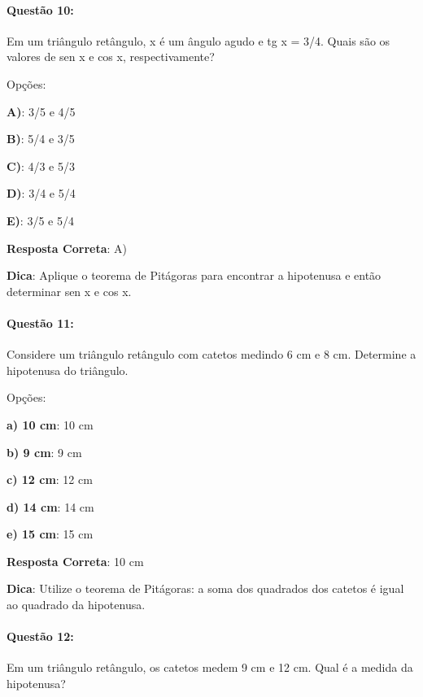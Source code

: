 \documentclass{article}
\begin{document}
\paragraph{Questão 10:}
{Em um triângulo retângulo, x é um ângulo agudo e tg x = 3/4. Quais são os valores de sen x e cos x, respectivamente?}

\vspace{\baselineskip}Opções:

\vspace{\baselineskip}\textbf{A)}: 3/5 e 4/5 

\textbf{B)}: 5/4 e 3/5 

\textbf{C)}: 4/3 e 5/3 

\textbf{D)}: 3/4 e 5/4 

\textbf{E)}: 3/5 e 5/4 

\vspace{\baselineskip}\textbf{Resposta Correta}: A)

\vspace{\baselineskip}\textbf{Dica}: Aplique o teorema de Pitágoras para encontrar a hipotenusa e então determinar sen x e cos x.

\paragraph{Questão 11:}
{Considere um triângulo retângulo com catetos medindo 6 cm e 8 cm. Determine a hipotenusa do triângulo.}

\vspace{\baselineskip}Opções:

\vspace{\baselineskip}\textbf{a) 10 cm}: 10 cm 

\textbf{b) 9 cm}: 9 cm 

\textbf{c) 12 cm}: 12 cm 

\textbf{d) 14 cm}: 14 cm 

\textbf{e) 15 cm}: 15 cm 

\vspace{\baselineskip}\textbf{Resposta Correta}: 10 cm

\vspace{\baselineskip}\textbf{Dica}: Utilize o teorema de Pitágoras: a soma dos quadrados dos catetos é igual ao quadrado da hipotenusa.

\paragraph{Questão 12:}
{Em um triângulo retângulo, os catetos medem 9 cm e 12 cm. Qual é a medida da hipotenusa?}
\end{document}
